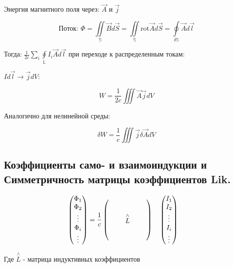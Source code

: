Энергия магнитного поля через: \( \vec{A} \text{ и } \vec{j} \) 

\[
\text{Поток: } \Phi=\underset{\mathbb{S}}{\iint}\vec{B}d\vec{S}=\underset{\mathbb{S}}{\iint}\mathrm{rot}\vec{A}d\vec{S}=\underset{\delta\mathbb{S}}{\oint}\vec{A}d\vec{l} 
\]

Тогда: \( \frac{1}{2c}\sum_{i}\underset{\mathbb{L}}{\oint}I_i \vec{A}d\vec{l}  \) при переходе к распределенным токам: 

\( Id\vec{l}\rightarrow\vec{j}dV \):

\[
\boxed{W=\frac{1}{2c}\iiint \vec{A}\vec{j}dV }
\]

Аналогично для нелинейной среды: 

\[
\boxed{\delta W=\frac{1}{c}\iiint \vec{j}\delta \vec{A} dV }
\]

\subsection*{Коэффициенты само-
и взаимоиндукции и Симметричность матрицы коэффициентов Lik.}

\[
    \begin{pmatrix}
        \Phi_1 \\
        \Phi_2 \\
        \vdots \\
        \Phi_i \\
        \vdots
        \end{pmatrix}
        =
        \renewcommand{\arraystretch}{1.8} %
        \setlength{\arraycolsep}{1.2em}   %
        \frac{1}{c} 
        \begin{pmatrix}
           &   &   \\
           & \overset{\wedge}{L} &   \\
           &   &  
        \end{pmatrix}
        \quad
        \renewcommand{\arraystretch}{1.} 
        \setlength{\arraycolsep}{1.2em}   
        \begin{pmatrix}
        I_1 \\
        I_2 \\
        \vdots \\
        I_i \\
        \vdots
        \end{pmatrix}
        \quad
\]

Где \(\overset{\wedge}{L}\) - матрица индуктивных коэффициентов

